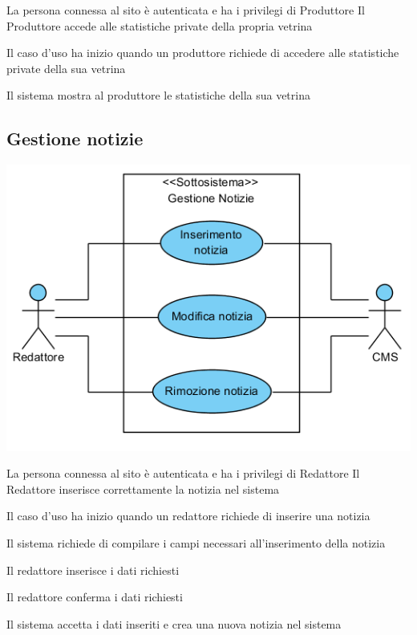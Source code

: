 \tabcuvspace

{}
{La persona connessa al sito è autenticata e ha i privilegi di Produttore}
{Il Produttore accede alle statistiche private della propria vetrina}
{\begin{enumCU}
		\item Il caso d'uso ha inizio quando un produttore richiede di accedere alle statistiche private della sua vetrina
		\item Il sistema mostra al produttore le statistiche della sua vetrina
	\end{enumCU}}


\subsection{Gestione notizie}
\begin{center}
   \includegraphics[width=\textwidth]{assets/visualParadigm/GestioneNotizie}
\end{center}
%
{}
{La persona connessa al sito è autenticata e ha i privilegi di Redattore}
{Il Redattore inserisce correttamente la notizia nel sistema}
{\begin{enumCU}
	\item Il caso d'uso ha inizio quando un redattore richiede di inserire una notizia  
	\item Il sistema richiede di compilare i campi necessari all'inserimento della notizia
	\item Il redattore inserisce i dati richiesti \label{cuinsnot:2}
	\item Il redattore conferma i dati richiesti
	\item Il sistema accetta i dati inseriti e crea una nuova notizia nel sistema
\end{enumCU}}
